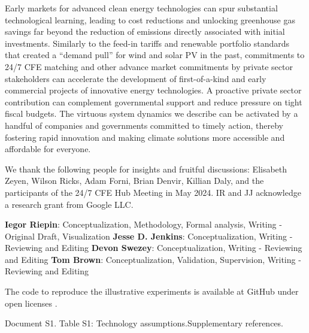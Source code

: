 \documentclass[pdflatex,sn-basic, Numbered]{sn-jnl}
\theoremstyle{thmstyleone}%
\theoremstyle{thmstyletwo}%
\theoremstyle{thmstylethree}%
\begin{document}
Early markets for advanced clean energy technologies can spur substantial technological learning, leading to cost reductions and unlocking greenhouse gas savings far beyond the reduction of emissions directly associated with initial investments.
Similarly to the feed-in tariffs and renewable portfolio standards that created a \enquote{demand pull} for wind and solar PV in the past, commitments to 24/7 CFE matching and other advance market commitments \cite{GoogleMicrosoftNucor} by private sector stakeholders can accelerate the development of first-of-a-kind and early commercial projects of innovative energy technologies.
A proactive private sector contribution can complement governmental support and reduce pressure on tight fiscal budgets.
The virtuous system dynamics we describe can be activated by a handful of companies and governments committed to timely action, thereby fostering rapid innovation and making climate solutions more accessible and affordable for everyone.

\backmatter

 We thank the following people for insights and fruitful discussions: Elisabeth Zeyen, Wilson Ricks, Adam Forni, Brian Denvir, Killian Daly, and the participants of the 24/7 CFE Hub Meeting in May 2024. IR and JJ acknowledge a research grant from Google LLC.

\textbf{Iegor Riepin}: Conceptualization, Methodology, Formal analysis, Writing - Original Draft, Visualization
\textbf{Jesse D. Jenkins}: Conceptualization, Writing - Reviewing and Editing
\textbf{Devon Swezey}: Conceptualization, Writing - Reviewing and Editing
\textbf{Tom Brown}: Conceptualization, Validation, Supervision, Writing - Reviewing and Editing

 The code to reproduce the illustrative experiments is available at GitHub under open licenses \cite{code247CFE}.

 Document S1. Table S1: Technology assumptions.Supplementary references.

\end{document}
